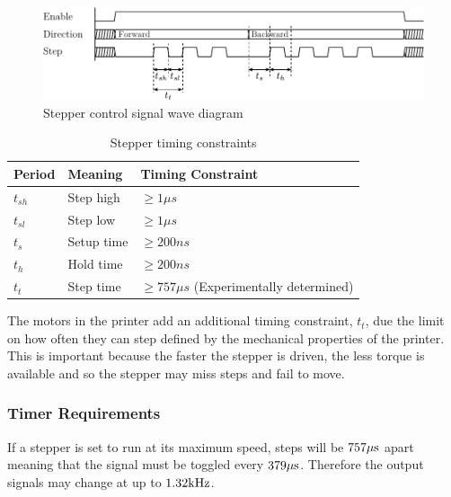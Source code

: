 				\begin{figure}
					\includegraphics[width=1\textwidth]{diagrams/stepperWave.pdf}
					\caption{Stepper control signal wave diagram}
					\label{fig:stepperWave}
				\end{figure}
				
				\begin{table}
					\centering
					\begin{tabular}{l l l}
						\toprule
						Period & Meaning & Timing Constraint\\
						\midrule
						$t_{sh}$ & Step high  & $\ge 1\mu{}s$ \cite{allegro} \\
						$t_{sl}$ & Step low   & $\ge 1\mu{}s$ \cite{allegro} \\
						\addlinespace
						$t_{s}$  & Setup time & $\ge 200ns$   \cite{allegro} \\
						$t_{h}$  & Hold time  & $\ge 200ns$   \cite{allegro} \\
						\addlinespace
						$t_{t}$  & Step time  & $\ge 757\mu{}s$ (Experimentally determined) \\
						\bottomrule
					\end{tabular}
					
					\caption{Stepper timing constraints}
					\label{tab:stepperTiming}
				\end{table}
				
				The motors in the printer add an additional timing constraint, $t_t$,
				due the limit on how often they can step defined by the mechanical
				properties of the printer. This is important because the faster the
				stepper is driven, the less torque is available and so the stepper may
				miss steps and fail to move.
			
			\subsubsection{Timer Requirements}
				
				If a stepper is set to run at its maximum speed, steps will be $757\mu\textrm{s}$
				apart meaning that the signal must be toggled every $379\mu\textrm{s}$.  Therefore
				the output signals may change at up to $1.32\textrm{kHz}$.
				
